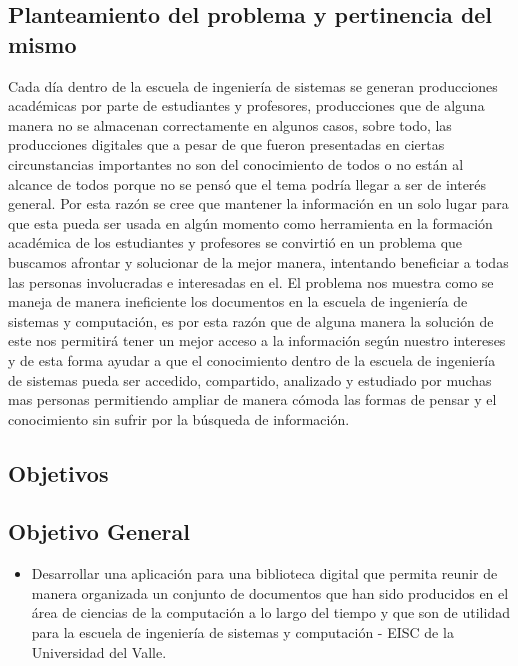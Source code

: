 \subsection{Planteamiento del problema y pertinencia del mismo}
        Cada día dentro de la escuela de ingeniería de sistemas se generan producciones académicas 			por parte de estudiantes y profesores, producciones que de alguna manera no se almacenan
        correctamente en algunos casos, sobre todo, las producciones digitales que a pesar de que
        fueron presentadas en ciertas circunstancias importantes no son del conocimiento de todos o
        no están al alcance de todos porque no se pensó que el tema podría llegar a ser de interés
        general. Por esta razón se cree que mantener la información en un solo lugar para que esta
        pueda ser usada en algún momento como herramienta en la formación académica de los 
        estudiantes y profesores se convirtió en un problema que buscamos afrontar y solucionar de
        la mejor manera, intentando beneficiar a todas las personas involucradas e interesadas en
        el.
        El problema nos muestra como se maneja de manera ineficiente los documentos en la escuela
        de ingeniería de sistemas y computación, es por esta razón que de alguna manera la solución
        de este nos permitirá tener un mejor acceso a la información según nuestro intereses y de
        esta forma ayudar a que el conocimiento dentro de la escuela de ingeniería de sistemas 
        pueda ser accedido, compartido, analizado y estudiado por muchas mas personas permitiendo 
        ampliar de manera cómoda las formas de pensar y el conocimiento sin sufrir por la búsqueda 
        de  información.
        
        \subsection{Objetivos}
        	\subsection{Objetivo General}
        	\begin{itemize}
        		\item Desarrollar una aplicación para una biblioteca digital que permita reunir de
        		manera organizada un conjunto de documentos que han sido producidos en el área de
        		ciencias de la computación a lo largo del tiempo y que son de utilidad para la 
        		escuela de ingeniería de sistemas y computación - EISC de la Universidad del Valle.
        	\end{itemize}
        	
